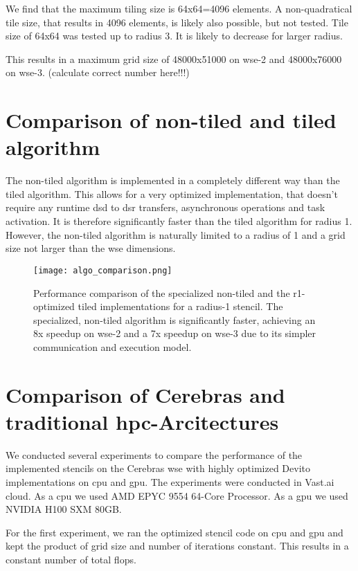 We find that the maximum tiling size  is 64x64=4096 elements.
A non-quadratical tile size, that results in 4096 elements, is likely also possible, but not tested.
Tile size of 64x64 was tested up to radius 3. It is likely to decrease for larger radius.

This results in a maximum grid size of 48000x51000 on wse-2 and 48000x76000 on wse-3. (calculate correct number here!!!)

\section{Comparison of non-tiled and tiled algorithm}

The non-tiled algorithm is implemented in a completely different way than the tiled algorithm.
This allows for a very optimized implementation, that doesn't require any runtime \ac{dsd} to \ac{dsr} transfers, asynchronous operations and task activation.
It is therefore significantly faster than the tiled algorithm for radius 1.
However, the non-tiled algorithm is naturally limited to a radius of 1 and a grid size not larger than the \ac{wse} dimensions.

\begin{figure}[h]
    \centering
    \texttt{[image: algo\_comparison.png]}
    \caption{Performance comparison of the specialized non-tiled and the r1-optimized tiled implementations for a radius-1 stencil. The specialized, non-tiled algorithm is significantly faster, achieving an 8x speedup on \ac{wse}-2 and a 7x speedup on \ac{wse}-3 due to its simpler communication and execution model.}
    \label{fig:algo_comparison}
\end{figure}

\section{Comparison of Cerebras and traditional \ac{hpc}-Arcitectures}
We conducted several experiments to compare the performance of the implemented stencils on the Cerebras \ac{wse} with highly optimized Devito implementations on \ac{cpu} and \ac{gpu}. The experiments were conducted in Vast.ai cloud.
As a \ac{cpu} we used AMD EPYC 9554 64-Core Processor.
As a \ac{gpu} we used NVIDIA H100 SXM 80GB.

For the first experiment, we ran the optimized stencil code on \ac{cpu} and \ac{gpu} and kept the product of grid size and number of iterations constant. This results in a constant number of total flops. 

